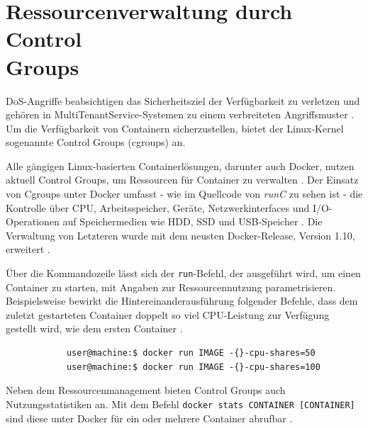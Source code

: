 \documentclass[../main.tex]{subfiles}
\begin{document}
	\section{Ressourcenverwaltung durch Control\\Groups}
  \label{secCgroups}
		\acrshort{DoS}-Angriffe beabsichtigen das Sicherheitsziel der Verfügbarkeit zu verletzen und gehören in \gls{MultiTenantService}-Systemen zu einem verbreiteten Angriffsmuster \cite[S.5]{dockerSec1}. Um die Verfügbarkeit von Containern sicherzustellen, bietet der Linux-Kernel sogenannte Control Groups (\acrshort{cgroups}) an.

		Alle gängigen Linux-basierten Containerlösungen, darunter auch Docker, nutzen aktuell Control Groups, um Ressourcen für Container zu verwalten \cite[S.16]{dockerSec2}. Der Einsatz von Cgroups unter Docker umfasst - wie im Quellcode von \emph{runC} zu sehen ist - die Kontrolle über \acrshort{CPU}, Arbeitsspeicher, Geräte, Netzwerkinterfaces und \acrshort{I/O}-Operationen auf Speichermedien wie \acrshort{HDD}, \acrshort{SSD} und \acrshort{USB}-Speicher \cite{cgroupsRedhat}\cite{githubRunCCgroups}. Die Verwaltung von Letzteren wurde mit dem neusten Docker-Release, Version 1.10, erweitert \cite{docker110}.


		Über die Kommandozeile lässt sich der \texttt{run}-Befehl, der ausgeführt wird, um einen Container zu starten, mit Angaben zur Ressourcennutzung parametrisieren. Beispielsweise bewirkt die Hintereinanderausführung folgender Befehle, dass dem zuletzt gestarteten Container doppelt so viel CPU-Leistung zur Verfügung gestellt wird, wie dem ersten Container \cite{dockerRun}.

		\begin{lstlisting}
			user@machine:$ docker run IMAGE -{}-cpu-shares=50
			user@machine:$ docker run IMAGE -{}-cpu-shares=100
		\end{lstlisting}

		Neben dem Ressourcenmanagement bieten Control Groups auch Nutzungsstatistiken an. Mit dem Befehl \texttt{docker stats \allowbreak{}CONTAINER [CONTAINER]} sind diese unter Docker für ein oder mehrere Container abrufbar \cite{dockerMetrics}.
\end{document}
